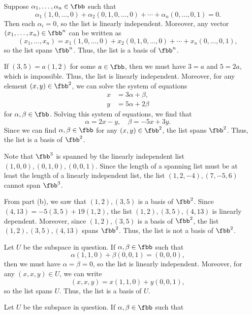 \begin{solenum}
    \item Suppose $\alpha_1, \ldots, \alpha_n \in \fbb$ such that
    \[
    	\alpha_1(1, 0, \ldots, 0) + \alpha_2(0, 1, 0, \ldots, 0) + \cdots + \alpha_n(0, \ldots, 0, 1) = 0.
    \]
    Then each $\alpha_i = 0$, so the list is linearly independent.
	Moreover, any vector $(x_1, \ldots, x_n) \in \fbb^n$ can be written as
    \[
    	(x_1, \ldots, x_n) = x_1(1, 0, \ldots, 0) + x_2(0, 1, 0, \ldots, 0) + \cdots + x_n(0, \ldots, 0, 1),
    \]
    so the list spans $\fbb^n$.
	Thus, the list is a basis of $\fbb^n$.
    \item If $(3, 5) = a(1, 2)$ for some $a \in \fbb$, then we must have $3 = a$ and $5 = 2a$, which is impossible.
	Thus, the list is linearly independent.
	Moreover, for any element $(x, y) \in \fbb^2$, we can solve the system of equations
    \begin{align*}
        x & = 3\alpha + \beta, \\
        y & = 5\alpha + 2\beta
    \end{align*}
    for $\alpha, \beta \in \fbb$.
	Solving this system of equations, we find that
    \[
    	\alpha = 2x - y, \quad \beta = -5x + 3y.
    \]
    Since we can find $\alpha, \beta \in \fbb$ for any $(x, y) \in \fbb^2$, the list spans $\fbb^2$.
	Thus, the list is a basis of $\fbb^2$.
    \item Note that $\fbb^3$ is spanned by the linearly independent list $(1, 0, 0), (0, 1, 0), (0, 0, 1)$.
	Since the length of a spanning list must be at least the length of a linearly independent list, the list $(1, 2, -4), (7, -5, 6)$ cannot span $\fbb^3$.
    \item From part (b), we saw that $(1, 2), (3, 5)$ is a basis of $\fbb^2$.
	Since $(4, 13) = -5(3, 5) + 19(1, 2)$, the list $(1, 2), (3, 5), (4, 13)$ is linearly dependent.
	Moreover, since $(1, 2), (3, 5)$ is a basis of $\fbb^2$, the list $(1, 2), (3, 5), (4, 13)$ spans $\fbb^2$.
	Thus, the list is not a basis of $\fbb^2$.
    \item Let $U$ be the subspace in question.
	If $\alpha, \beta \in \fbb$ such that
    \[
    	\alpha(1, 1, 0) + \beta(0, 0, 1) = (0, 0, 0),
    \]
    then we must have $\alpha = \beta = 0$, so the list is linearly independent.
	Moreover, for any $(x, x, y) \in U$, we can write
    \[
    	(x, x, y) = x(1, 1, 0) + y(0, 0, 1),
    \]
    so the list spans $U$.
	Thus, the list is a basis of $U$.
    \item Let $U$ be the subspace in question.
	If $\alpha, \beta \in \fbb$ such that

\end{solenum}
